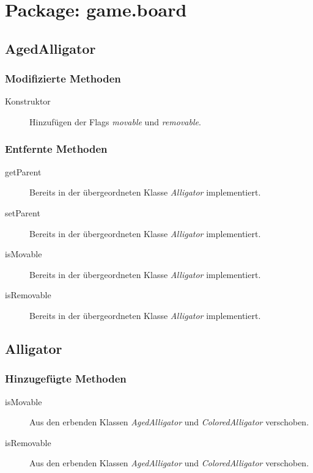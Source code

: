\section{Package: game.board}

\subsection{AgedAlligator}

\subsubsection{Modifizierte Methoden}
\begin{description}
\item[Konstruktor]
Hinzufügen der Flags \emph{movable} und \emph{removable}.
\end{description}

\subsubsection{Entfernte Methoden}
\begin{description}
\item[getParent]
Bereits in der übergeordneten Klasse \emph{Alligator} implementiert.
\item[setParent]
Bereits in der übergeordneten Klasse \emph{Alligator} implementiert.
\item[isMovable]
Bereits in der übergeordneten Klasse \emph{Alligator} implementiert.
\item[isRemovable]
Bereits in der übergeordneten Klasse \emph{Alligator} implementiert.
\end{description}


\subsection{Alligator}

\subsubsection{Hinzugefügte Methoden}
\begin{description}
\item[isMovable]
Aus den erbenden Klassen \emph{AgedAlligator} und \emph{ColoredAlligator} verschoben.
\item[isRemovable]
Aus den erbenden Klassen \emph{AgedAlligator} und \emph{ColoredAlligator} verschoben.
\end{description}


